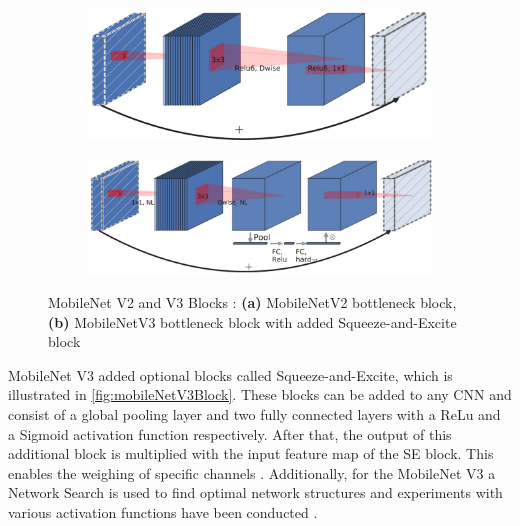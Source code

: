 \begin{figure}[H]
    \centering
    \begin{subfigure}{0.6\textwidth}
        \centering
        \includegraphics[width=\linewidth, keepaspectratio]{PICs/backbones/mobilenetv2_bottleneck.jpg}
        \caption{}
        \label{fig:mobileNetV2Block}
    \end{subfigure}
    \qquad
    \begin{subfigure}{0.6\textwidth}
        \centering
        \vspace{0.8cm}
        \includegraphics[width=\linewidth, keepaspectratio]{PICs/backbones/mobilenetv3_bottleneck_SE.jpg}
        \caption{}
        \label{fig:mobileNetV3Block}
    \end{subfigure}
    \caption{MobileNet V2 and V3 Blocks \cite{MobileNetV3}: \textbf{(a)} MobileNetV2 bottleneck block, \textbf{(b)} MobileNetV3 bottleneck block with added Squeeze-and-Excite block}
    \label{fig:mobileNetBlocks}
\end{figure}


\noindent MobileNet V3 added optional blocks called Squeeze-and-Excite, which is illustrated in \autoref{fig:mobileNetV3Block}. 
These blocks can be added to any CNN and consist of a global pooling layer and two fully connected layers with a ReLu and a Sigmoid activation function respectively.
After that, the output of this additional block is multiplied with the input feature map of the SE block.
This enables the weighing of specific channels \cite{SqueezeAndExcitation2019}.
Additionally, for the MobileNet V3 a Network Search is used to find optimal network structures and experiments with various activation functions have been conducted \cite{MobileNetV3}.

